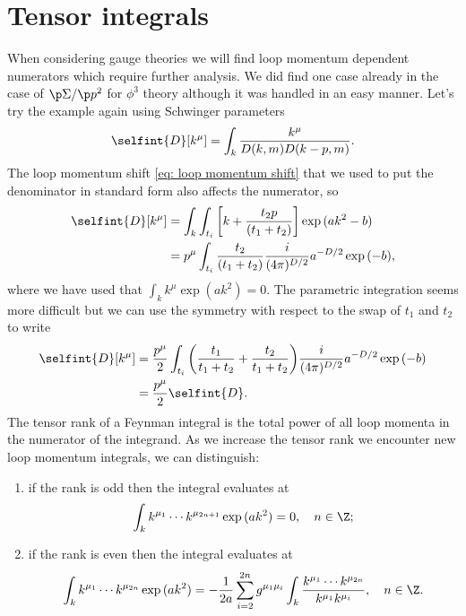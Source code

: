 \section{Tensor integrals}
When considering gauge theories we will find loop momentum dependent numerators which require further analysis. We did find one case already in the case of $\p\Sigma/\p p^2$ for $\phi^3$ theory although it was handled in an easy manner. Let's try the example again using Schwinger parameters
\begin{equation}
    \selfint{D}[k^\mu] = \int_k\frac{k^\mu}{D(k,m)D(k - p,m)}.
\end{equation}
The loop momentum shift \eqref{eq: loop momentum shift} that we used to put the denominator in standard form also affects the numerator, so
\begin{equation}
    \begin{split}
        \selfint{D}[k^\mu] &= \int_k\int_{t_i}\bigg[k + \frac{t_2p}{(t_1 + t_2)}\bigg]\exp{(ak^2 - b)} \\
        &= p^\mu\int_{t_i}\frac{t_2}{(t_1 + t_2)}\frac{i}{(4\pi)^{D/2}}a^{-D/2}\exp{(-b)},
    \end{split}
\end{equation}
where we have used that $\int_k k^\mu\exp{(ak^2)} = 0$. The parametric integration seems more difficult but we can use the symmetry with respect to the swap of $t_1$ and $t_2$ to write
\begin{equation}
    \begin{split}
        \selfint{D}[k^\mu] &= \frac{p^\mu}{2}\int_{t_i}\bigg(\frac{t_1}{t_1 + t_2} + \frac{t_2}{t_1 + t_2}\bigg)\frac{i}{(4\pi)^{D/2}}a^{-D/2}\exp{(-b)} \\
        &= \frac{p^\mu}{2}\selfint{D}.
    \end{split}
\end{equation}
The tensor rank of a Feynman integral is the total power of all loop momenta in the numerator of the integrand. As we increase the tensor rank we encounter new loop momentum integrals, we can distinguish:
\begin{enumerate}
    \item if the rank is odd then the integral evaluates at
    \begin{equation}
    \label{eq: odd rank Feynman integrals}
        \int_k k^{\mu_1}\cdots k^{\mu_{2n + 1}} \exp{(ak^2)} = 0,\quad n \in \Z;
    \end{equation}
    \item if the rank is even then the integral evaluates at
    \begin{equation}
    \label{eq: even rank Feynman integrals}
        \int_k k^{\mu_1}\cdots k^{\mu_{2n}} \exp{(ak^2)} = -\frac{1}{2a}\sum_{i=2}^{2n}g^{\mu_1\mu_i}\int_k\frac{k^{\mu_1}\cdots k^{\mu_{2n}}}{k^{\mu_1}k^{\mu_i}},\quad n \in \Z.
    \end{equation}
\end{enumerate}
